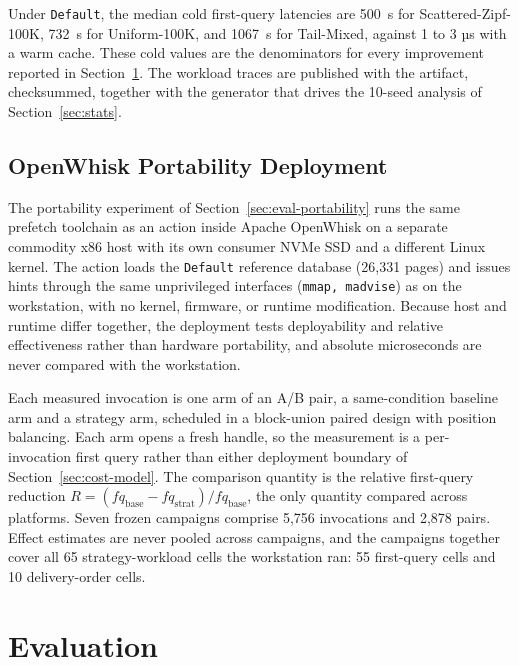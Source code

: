 \documentclass[sigconf, nonacm]{acmart}
\begin{document}
Under \texttt{Default}, the median cold first-query latencies are 500~\textmu s for Scattered-Zipf-100K, 732~\textmu s for Uniform-100K, and 1067~\textmu s for Tail-Mixed, against 1 to 3 µs with a warm cache. These cold values are the denominators for every improvement reported in Section~\ref{sec:evaluation}. The workload traces are published with the artifact, checksummed, together with the generator that drives the 10-seed analysis of Section~\ref{sec:stats}.

\subsection{OpenWhisk Portability Deployment}\label{sec:setup-openwhisk}

The portability experiment of Section~\ref{sec:eval-portability} runs the same prefetch toolchain as an action inside Apache OpenWhisk on a separate commodity x86 host with its own consumer NVMe SSD and a different Linux kernel. The action loads the \texttt{Default} reference database (26{,}331 pages) and issues hints through the same unprivileged interfaces (\texttt{mmap, madvise}) as on the workstation, with no kernel, firmware, or runtime modification. Because host and runtime differ together, the deployment tests deployability and relative effectiveness rather than hardware portability, and absolute microseconds are never compared with the workstation.

Each measured invocation is one arm of an A/B pair, a same-condition baseline arm and a strategy arm, scheduled in a block-union paired design with position balancing. Each arm opens a fresh handle, so the measurement is a per-invocation first query rather than either deployment boundary of Section~\ref{sec:cost-model}. The comparison quantity is the relative first-query reduction $R = (\mathit{fq}_{\mathrm{base}} - \mathit{fq}_{\mathrm{strat}})/\mathit{fq}_{\mathrm{base}}$, the only quantity compared across platforms. Seven frozen campaigns comprise 5{,}756 invocations and 2{,}878 pairs. Effect estimates are never pooled across campaigns, and the campaigns together cover all 65 strategy-workload cells the workstation ran: 55 first-query cells and 10 delivery-order cells.

\section{Evaluation}\label{sec:evaluation}
\end{document}

